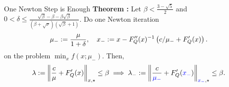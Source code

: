\documentclass[9pt]{beamer}
\begin{document}
\begin{frame}{One Newton Step is Enough}
  \textbf{Theorem :}
  Let $\beta < \frac{3-\sqrt{5}}{2}$ and $0<\delta \leq \frac{\sqrt{\beta}-\beta-\beta\sqrt{\beta}}{(\beta + \sqrt{\nu})(\sqrt{\beta}+1)}$.
  Do one Newton iteration
  \[
    \mu_{-} := \frac{\mu}{1+\delta}, \quad x_{-} := x - F''_Q(x)^{-1}\left(c/\mu_{-}+F'_Q(x)\right).
  \]
  on the problem $\min_x f(x; \mu_-)$.
  Then,
  \[
    \lambda := \left\|\frac{c}{\mu} + F'_Q(x)\right\|_{x, \star}\leq \beta \implies \lambda_{-} := \left\|\frac{c}{{\color{blue} \mu_{-}}} + F'_Q({\color{blue} x_{-}})\right\|_{{\color{blue} x_{-}}, \star}\leq \beta.
  \]

\end{frame}
\end{document}
